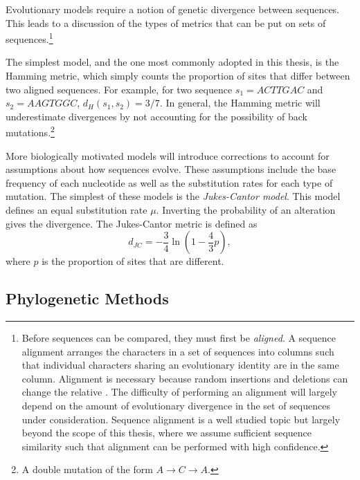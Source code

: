 Evolutionary models require a notion of genetic divergence between sequences.
This leads to a discussion of the types of metrics that can be put on sets of sequences.\footnote{Before sequences can be compared, they must first be \emph{aligned}. A sequence alignment arranges the characters in a set of sequences into columns such that individual characters sharing an evolutionary identity are in the same column. Alignment is necessary because random insertions and deletions can change the relative . The difficulty of performing an alignment will largely depend on the amount of evolutionary divergence in the set of sequences under consideration. Sequence alignment is a well studied topic but largely beyond the scope of this thesis, where we assume sufficient sequence similarity such that alignment can be performed with high confidence.}

The simplest model, and the one most commonly adopted in this thesis, is the Hamming metric, which simply counts the proportion of sites that differ between two aligned sequences.
For example, for two sequence $s_1=ACTTGAC$ and $s_2=AAGTGGC$, $d_{H}(s_1,s_2)=3/7$.
In general, the Hamming metric will underestimate divergences by not accounting for the possibility of back mutations.\footnote{A double mutation of the form $A\rightarrow C\rightarrow A$.}

More biologically motivated models will introduce corrections to account for assumptions about how sequences evolve.
These assumptions include the base frequency of each nucleotide as well as the substitution rates for each type of mutation.
The simplest of these models is the \emph{Jukes-Cantor model}.
This model defines an equal substitution rate $\mu$.
Inverting the probability of an alteration gives the divergence.
The Jukes-Cantor metric is defined as 
\begin{equation}
d_{JC}=-\frac{3}{4}\ln(1-\frac{4}{3}p),
\end{equation}
where $p$ is the proportion of sites that are different.

\subsection{Phylogenetic Methods}
\label{bg:bio:phylo}

